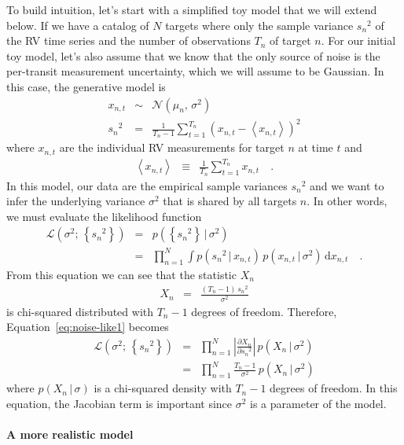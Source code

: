 \documentclass[modern, letterpaper]{aastex63}
\newcommand{\dd}{\ensuremath{\,\mathrm{d}}}
\begin{document}
To build intuition, let's start with a simplified toy model that we will extend below.
If we have a catalog of $N$ targets where only the sample variance ${s_n}^2$ of the RV time series and the number of observations $T_n$ of target $n$.
For our initial toy model, let's also assume that we know that the only source of noise is the per-transit measurement uncertainty, which we will assume to be Gaussian.
In this case, the generative model is
\begin{eqnarray}
  x_{n,t} &\sim& \mathcal{N}(\mu_n,\,\sigma^2) \\
  {s_n}^2 &=& \frac{1}{T_n - 1}\sum_{t=1}^{T_n} \left(x_{n,t} - \left< x_{n,t} \right>\right)^2
\end{eqnarray}
where $x_{n,t}$ are the individual RV measurements for target $n$ at time $t$ and
\begin{eqnarray}
  \left< x_{n,t} \right> &\equiv& \frac{1}{T_n}\sum_{t=1}^{T_n}x_{n,t} \quad.
\end{eqnarray}
In this model, our data are the empirical sample variances ${s_n}^2$ and we want to infer the underlying variance $\sigma^2$ that is shared by all targets $n$.
In other words, we must evaluate the likelihood function
\begin{eqnarray}
  \label{eq:noise-like1}
  \mathcal{L}(\sigma^2;\,\left\{{s_n}^2\right\}) &=& p(\left\{{s_n}^2\right\}\,|\,\sigma^2) \\
  &=& \prod_{n=1}^N\int p({s_n}^2\,|\,x_{n,t})\,p(x_{n,t}\,|\,\sigma^2) \dd x_{n,t}\quad.
\end{eqnarray}
From this equation we can see that the statistic $X_n$
\begin{eqnarray}
  X_n &=& \frac{(T_n - 1)\,{s_n}^2}{\sigma^2}
\end{eqnarray}
is chi-squared distributed with $T_n - 1$ degrees of freedom.
Therefore, Equation~\ref{eq:noise-like1} becomes
\begin{eqnarray}
  \label{eq:noise-like2}
  \mathcal{L}(\sigma^2;\,\left\{{s_n}^2\right\}) &=& \prod_{n=1}^N \left|\frac{\partial X_n}{\partial {s_n}^2}\right|\,p(X_n\,|\,\sigma^2) \nonumber\\
  &=& \prod_{n=1}^N \frac{T_n - 1}{\sigma^2}\,p(X_n\,|\,\sigma^2)
\end{eqnarray}
where $p(X_n\,|\,\sigma)$ is a chi-squared density with $T_n - 1$ degrees of freedom.
In this equation, the Jacobian term is important since $\sigma^2$ is a parameter of the model.

\paragraph{A more realistic model}
\end{document}
